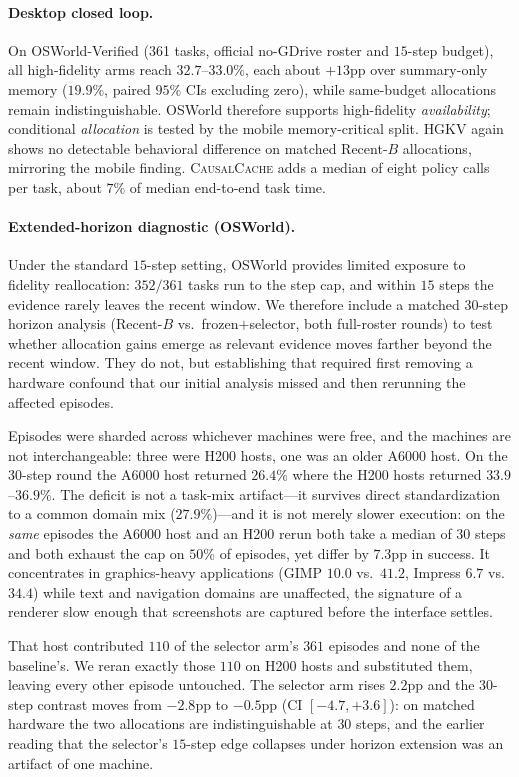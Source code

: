 \documentclass[letterpaper]{article} %
\newcommand{\method}{\textsc{CausalCache}}
\newcommand{\hgkv}{\textsc{HGKV}}
\begin{document}
\paragraph{Desktop closed loop.}
On OSWorld-Verified (361 tasks, official no-GDrive roster and
$15$-step budget), all high-fidelity arms reach $32.7$--$33.0\%$, each
about $+13$pp over summary-only memory ($19.9\%$, paired $95\%$ CIs
excluding zero), while same-budget allocations remain
indistinguishable. OSWorld therefore supports high-fidelity
\emph{availability}; conditional \emph{allocation} is tested by the mobile
memory-critical split. \hgkv{} again shows no detectable behavioral difference on matched
Recent-$B$ allocations, mirroring the mobile finding. \method{} adds a
median of eight policy calls per task, about $7\%$ of median end-to-end
task time.

\paragraph{Extended-horizon diagnostic (OSWorld).}
Under the standard $15$-step setting, OSWorld provides limited exposure
to fidelity reallocation: $352/361$ tasks run to the step cap, and within
$15$ steps the evidence rarely leaves the recent window. We therefore
include a matched $30$-step horizon analysis (Recent-$B$ vs.\
frozen$+$selector, both full-roster rounds) to test whether allocation
gains emerge as relevant evidence moves farther beyond the recent
window. They do not, but establishing that required first removing a
hardware confound that our initial analysis missed and then rerunning
the affected episodes.

Episodes were sharded across whichever machines were free, and the
machines are not interchangeable: three were H200 hosts, one was an
older A6000 host. On the $30$-step round the A6000 host returned
$26.4\%$ where the H200 hosts returned $33.9$--$36.9\%$. The deficit is
not a task-mix artifact---it survives direct standardization to a common
domain mix ($27.9\%$)---and it is not merely slower execution: on the
\emph{same} episodes the A6000 host and an H200 rerun both take a median
of $30$ steps and both exhaust the cap on $50\%$ of episodes, yet differ
by $7.3$pp in success. It concentrates in graphics-heavy applications
(GIMP $10.0$ vs.\ $41.2$, Impress $6.7$ vs.\ $34.4$) while text and
navigation domains are unaffected, the signature of a renderer slow
enough that screenshots are captured before the interface settles.

That host contributed $110$ of the selector arm's $361$ episodes and
none of the baseline's. We reran exactly those $110$ on H200 hosts and
substituted them, leaving every other episode untouched. The selector
arm rises $2.2$pp and the $30$-step contrast moves from $-2.8$pp to
$-0.5$pp (CI $[-4.7,+3.6]$): on matched hardware the two allocations are
indistinguishable at $30$ steps, and the earlier reading that the
selector's $15$-step edge collapses under horizon extension was an
artifact of one machine.
\end{document}
